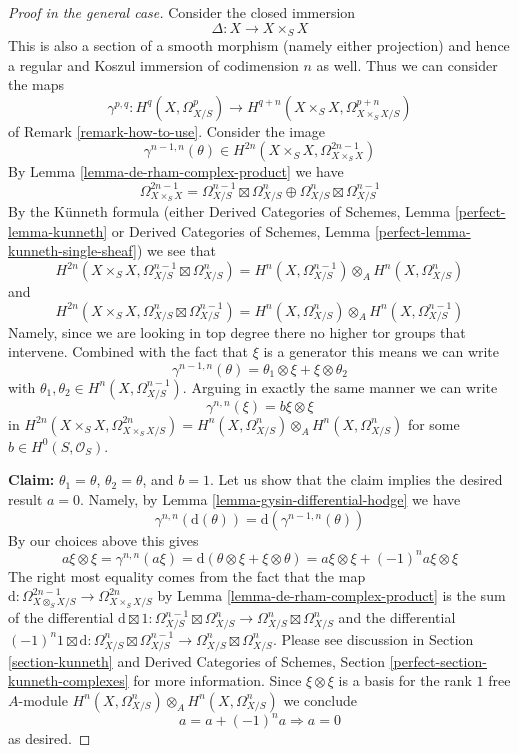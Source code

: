 \begin{proof}[Proof in the general case]
\medskip\noindent
Consider the closed immersion
$$
\Delta : X \to X \times_S X
$$
This is also a section of a smooth morphism (namely either projection)
and hence a regular and Koszul immersion of codimension $n$ as well.
Thus we can consider the maps
$$
\gamma^{p, q} :
H^q(X, \Omega^p_{X/S})
\longrightarrow
H^{q + n}(X \times_S X, \Omega^{p + n}_{X \times_S X/S})
$$
of Remark \ref{remark-how-to-use}. Consider the image
$$
\gamma^{n - 1, n}(\theta) \in
H^{2n}(X \times_S X, \Omega^{2n - 1}_{X \times_S X})
$$
By Lemma \ref{lemma-de-rham-complex-product} we have
$$
\Omega^{2n - 1}_{X \times_S X} =
\Omega^{n - 1}_{X/S} \boxtimes \Omega^n_{X/S} \oplus
\Omega^n_{X/S} \boxtimes \Omega^{n - 1}_{X/S}
$$
By the K\"unneth formula (either
Derived Categories of Schemes, Lemma \ref{perfect-lemma-kunneth} or
Derived Categories of Schemes, Lemma \ref{perfect-lemma-kunneth-single-sheaf})
we see that
$$
H^{2n}(X \times_S X, \Omega^{n - 1}_{X/S} \boxtimes \Omega^n_{X/S}) =
H^n(X, \Omega^{n - 1}_{X/S}) \otimes_A H^n(X, \Omega^n_{X/S})
$$
and
$$
H^{2n}(X \times_S X, \Omega^n_{X/S} \boxtimes \Omega^{n - 1}_{X/S}) =
H^n(X, \Omega^n_{X/S}) \otimes_A H^n(X, \Omega^{n - 1}_{X/S})
$$
Namely, since we are looking in top degree there no higher tor groups
that intervene. Combined with the fact that $\xi$ is a generator this means
we can write
$$
\gamma^{n - 1, n}(\theta) = \theta_1 \otimes \xi + \xi \otimes \theta_2
$$
with $\theta_1, \theta_2 \in H^n(X, \Omega^{n - 1}_{X/S})$.
Arguing in exactly the same manner we can write
$$
\gamma^{n, n}(\xi) = b \xi \otimes \xi
$$
in
$H^{2n}(X \times_S X, \Omega^{2n}_{X \times_S X/S}) =
H^n(X, \Omega^n_{X/S}) \otimes_A H^n(X, \Omega^n_{X/S})$
for some $b \in H^0(S, \mathcal{O}_S)$.

\medskip\noindent
{\bf Claim:} $\theta_1 = \theta$, $\theta_2 = \theta$, and $b = 1$.
Let us show that the claim implies the desired result $a = 0$.
Namely, by Lemma \ref{lemma-gysin-differential-hodge}
we have
$$
\gamma^{n, n}(\text{d}(\theta)) = \text{d}(\gamma^{n - 1, n}(\theta))
$$
By our choices above this gives
$$
a \xi \otimes \xi =
\gamma^{n, n}(a\xi) =
\text{d}(\theta \otimes \xi + \xi \otimes \theta) =
a \xi \otimes \xi + (-1)^n a \xi \otimes \xi
$$
The right most equality comes from the fact that the map
$\text{d} : \Omega^{2n - 1}_{X \otimes_S X/S} \to \Omega^{2n}_{X \times_S X/S}$
by Lemma \ref{lemma-de-rham-complex-product}
is the sum of the differential
$\text{d} \boxtimes 1 : \Omega^{n - 1}_{X/S} \boxtimes \Omega^n_{X/S}
\to \Omega^n_{X/S} \boxtimes \Omega^n_{X/S}$
and the differential
$(-1)^n 1 \boxtimes \text{d} : \Omega^n_{X/S} \boxtimes \Omega^{n - 1}_{X/S}
\to \Omega^n_{X/S} \boxtimes \Omega^n_{X/S}$. Please see discussion in
Section \ref{section-kunneth} and
Derived Categories of Schemes, Section
\ref{perfect-section-kunneth-complexes} for more information.
Since $\xi \otimes \xi$ is a basis for the rank $1$ free $A$-module
$H^n(X, \Omega^n_{X/S}) \otimes_A H^n(X, \Omega^n_{X/S})$
we conclude
$$
a = a + (-1)^n a \Rightarrow a = 0
$$
as desired.


\end{proof}
